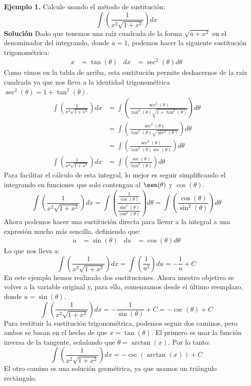 \documentclass[12pt]{article}
\begin{document}
\textbf{Ejemplo 1.} Calcule usando el método de sustitución:
\[
  \int \left(\frac{1}{x^{2}\sqrt{1 + x^{2}}}\right) dx
\]
\textbf{Solución} Dado que tenemos una raíz cuadrada de la forma $\sqrt{a + x^{2}}$ en el denominador del integrando, donde $a = 1$, podemos hacer la siguiente sustitución trigonométrica:
\begin{align*}
  x &= \tan(\theta) & dx &= \sec^{2}(\theta) d\theta
\end{align*}
Como vimos en la tabla de arriba, esta sustitución permite deshacernos de la raíz cuadrada ya que nos lleva a la identidad trigonométrica $\sec^{2}(\theta) = 1 + \tan^{2}(\theta)$.
\begin{align*}
  \int \left(\frac{1}{x^{2}\sqrt{1 + x^{2}}}\right) dx &= \int \left(\frac{\sec^{2}(\theta)}{\tan^{2}(\theta)\sqrt{1 + \tan^{2}(\theta)}}\right) d\theta \\
                                                       &= \int \left(\frac{\sec^{2}(\theta)}{\tan^{2}(\theta)\sqrt{\sec^{2}(\theta)}}\right) d\theta \\
                                                       &= \int \left(\frac{\sec^{2}(\theta)}{\tan^{2}(\theta)\sec(\theta)}\right) d\theta \\
  \int \left(\frac{1}{x^{2}\sqrt{1 + x^{2}}}\right) dx &= \int \left(\frac{\sec(\theta)}{\tan^{2}(\theta)}\right) d\theta
\end{align*}
Para facilitar el cálculo de esta integral, lo mejor es seguir simplificando el integrando en funciones que solo contengan al $\sen(\theta)$ y $\cos(\theta)$.
\[
  \int \left(\frac{1}{x^{2}\sqrt{1 + x^{2}}}\right) dx = \int \left(\frac{\frac{1}{\cos(\theta)}}{\frac{\sin^{2}(\theta)}{\cos^{2}(\theta)}}\right) d\theta
                                                       = \int \left(\frac{\cos(\theta)}{\sin^{2}(\theta)}\right) d\theta
\]
Ahora podemos hacer una sustitución directa para llevar a la integral a una expresión mucho más sencilla, definiendo que:
\begin{align*}
  u &= \sin(\theta) & du &= \cos(\theta) d\theta
\end{align*}
Lo que nos lleva a:
\[
  \int \left(\frac{1}{x^{2}\sqrt{1 + x^{2}}}\right) dx = \int \left(\frac{1}{u^{2}}\right) du = -\frac{1}{u} + C
\]
En este ejemplo hemos realizado dos sustituciones. Ahora nuestro objetivo es volver a la variable original y, para ello, comenzamos desde el último reemplazo, donde $u = \sin(\theta)$.
\[
  \int \left(\frac{1}{x^{2}\sqrt{1 + x^{2}}}\right) dx = -\frac{1}{\sin(\theta)} + C = - \csc(\theta) + C
\]
Para restituir la sustitución trigonométrica, podemos seguir dos caminos, pero ambos se basan en el hecho de que $x = \tan(\theta)$. El primero es usar la función inversa de la tangente, señalando que $\theta = \arctan(x)$. Por lo tanto:
\[
  \int \left(\frac{1}{x^{2}\sqrt{1 + x^{2}}}\right) dx = - \csc(\arctan(x)) + C
\]
El otro camino es una solución geométrica, ya que usamos un triángulo rectángulo.
\end{document}

